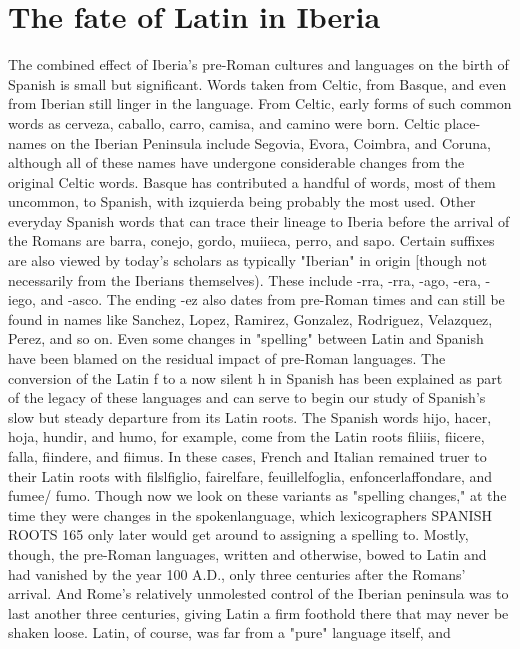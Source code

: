 \documentclass[14pt,a4paper,oneside]{memoir}
\begin{document}
{{{{\section{The fate of Latin in Iberia}

The combined effect of Iberia's pre-Roman cultures and languages on the birth of Spanish is small but significant. Words taken
from Celtic, from Basque, and even from Iberian still linger in the language. From Celtic, early forms of such common words as cerveza, caballo, carro, camisa, and camino were born. Celtic place-names on
the Iberian Peninsula include Segovia, Evora, Coimbra, and Coruna, although all of these names have undergone considerable changes from
the original Celtic words. Basque has contributed a handful of words,
most of them uncommon, to Spanish, with izquierda being probably
the most used.
Other everyday Spanish words that can trace their lineage to
Iberia before the arrival of the Romans are barra, conejo, gordo, muiieca, perro, and sapo. Certain suffixes are also viewed by today's scholars as typically "Iberian" in origin [though not necessarily from the
Iberians themselves). These include -rra, -rra, -ago, -era, -iego, and
-asco. The ending -ez also dates from pre-Roman times and can still
be found in names like Sanchez, Lopez, Ramirez, Gonzalez, Rodriguez,
Velazquez, Perez, and so on.
Even some changes in "spelling" between Latin and Spanish
have been blamed on the residual impact of pre-Roman languages. The
conversion of the Latin f to a now silent h in Spanish has been explained as part of the legacy of these languages and can serve to begin
our study of Spanish's slow but steady departure from its Latin roots.
The Spanish words hijo, hacer, hoja, hundir, and humo, for example,
come from the Latin roots filiiis, fiicere, falla, fiindere, and fiimus. In
these cases, French and Italian remained truer to their Latin roots with
filslfiglio, fairelfare, feuillelfoglia, enfoncerlaffondare, and fumee/
fumo. Though now we look on these variants as "spelling changes," at
the time they were changes in the spokenlanguage, which lexicographers
SPANISH ROOTS 165
only later would get around to assigning a spelling to. Mostly, though,
the pre-Roman languages, written and otherwise, bowed to Latin and
had vanished by the year 100 A.D., only three centuries after the Romans' arrival. And Rome's relatively unmolested control of the Iberian
peninsula was to last another three centuries, giving Latin a firm foothold there that may never be shaken loose.
Latin, of course, was far from a "pure" language itself, and
}}}}
\end{document}
